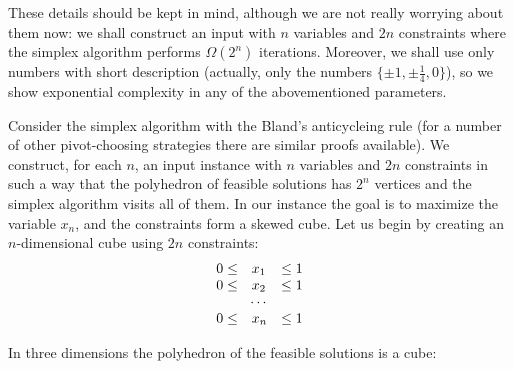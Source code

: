 \noindent
These details should be kept in mind, although we are not really worrying about them now: we shall construct an 
input with $n$ variables and $2n$ constraints where the simplex algorithm performs $\Omega(2^n)$ iterations.
Moreover, we shall use only numbers with short description (actually, only the numbers  
$\{\pm1,\pm\frac{1}{4},0\}$), so we show exponential complexity in any of the abovementioned parameters.

\noindent
Consider the simplex algorithm with the Bland's anticycleing rule (for a number of other pivot-choosing
strategies there are similar proofs available). We construct, for each $n$, an input instance with $n$ variables
and $2n$ constraints in such a way that the polyhedron of feasible solutions has $2^n$ vertices
and the simplex algorithm visits all of them. In our instance the goal is to maximize the variable $x_n$,
and the constraints form a skewed cube. Let us begin by creating an $n$-dimensional cube using
$2n$ constraints:
$$
\begin{array}{rll}
  0\le &x_1& \le 1\\
  0\le &x_2& \le 1\\
  \multicolumn{3}{c}{\cdots}\\
  0\le &x_n& \le 1
\end{array}
$$

\noindent
In three dimensions the polyhedron of the feasible solutions is a cube:
\renewcommand{\common}{
    \draw[->,thin]
      (1,0,0) -- (1.2,0,0) node[anchor=north east]{$x$};
    \draw[->,thin]
      (0,1,0) -- (0,1.2,0) node[anchor=north west]{$y$};
    \draw[->,thin]
      (0,0,1) -- (0,0,1.2) node[anchor=south]{$z$};

}

\newcommand{\tmpNode}[2]{
  (#1) circle (.5pt) node[anchor=#2] {\footnotesize $(#1)$}
}

\begin{center}
\end{center}


